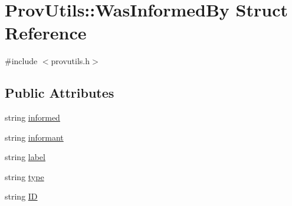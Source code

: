 \hypertarget{struct_prov_utils_1_1_was_informed_by}{\section{Prov\-Utils\-:\-:Was\-Informed\-By Struct Reference}
\label{struct_prov_utils_1_1_was_informed_by}
}


{\ttfamily \#include $<$provutils.\-h$>$}

\subsection*{Public Attributes}
\begin{DoxyCompactItemize}
\item 
string \hyperlink{struct_prov_utils_1_1_was_informed_by_ac34a2f8f42c52c7a1bf240182cb1070b}{informed}
\item 
string \hyperlink{struct_prov_utils_1_1_was_informed_by_a614d109abfeacef33acff0701784efa9}{informant}
\item 
string \hyperlink{struct_prov_utils_1_1_was_informed_by_adaa45666484c33890b6c384736c63898}{label}
\item 
string \hyperlink{struct_prov_utils_1_1_was_informed_by_a5ab1cf3b00d8c91ba8f6ce3c862cc1c4}{type}
\item 
string \hyperlink{struct_prov_utils_1_1_was_informed_by_ad3d5d14bb09c1bab4e5218ca30d60b14}{I\-D}
\end{DoxyCompactItemize}


